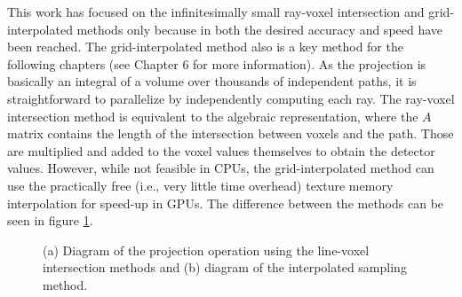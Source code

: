 This work has focused on the infinitesimally small ray-voxel intersection and grid-interpolated methods only because in both the desired accuracy and speed have been reached. The grid-interpolated method also is a key method for the following chapters (see Chapter 6 for more information). As the projection is basically an integral of a volume over thousands of independent paths, it is straightforward to parallelize by independently computing each ray. The ray-voxel intersection method is equivalent to the algebraic representation, where the $A$ matrix contains the length of the intersection between voxels and the path. Those are multiplied and added to the voxel values themselves to obtain the detector values. However, while not feasible in CPUs, the grid-interpolated method can use the practically free (i.e., very little time overhead) texture memory interpolation for speed-up in GPUs. The difference between the methods can be seen in figure \ref{fig:Amatrix}. 

\begin{figure}

\begin{center} 
 
\caption[Diagram of projection types]{\label{fig:Amatrix}(a) Diagram of the projection operation using the line-voxel intersection methods and (b) diagram of the interpolated sampling method.} 
\end{center} 
\end{figure}

